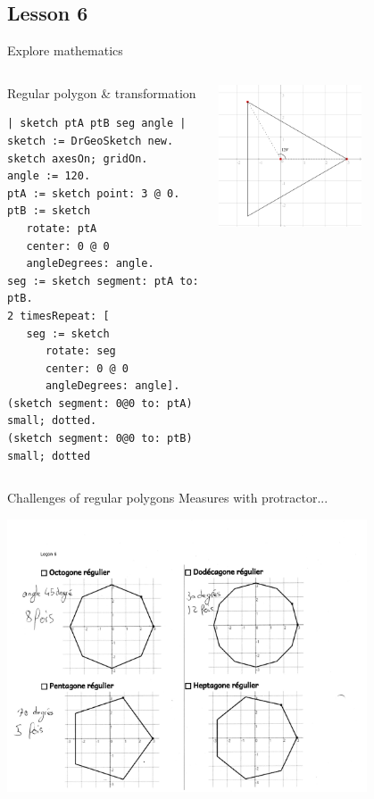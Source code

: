 \documentclass{beamer}
\begin{document}
\subsection{Lesson 6}
\begin{frame}[fragile]{Explore mathematics}
  \begin{columns}[c]
    \begin{column}{0.5\textwidth}
      Regular polygon \& transformation
      \vspace*{10pt}
      \fontsize{9pt}{0pt}\selectfont
      \begin{lstlisting}[language=Smalltalk]
| sketch ptA ptB seg angle |
sketch := DrGeoSketch new.
sketch axesOn; gridOn.
angle := 120.
ptA := sketch point: 3 @ 0.
ptB := sketch
   rotate: ptA
   center: 0 @ 0
   angleDegrees: angle.
seg := sketch segment: ptA to: ptB.
2 timesRepeat: [
   seg := sketch
      rotate: seg
      center: 0 @ 0
      angleDegrees: angle].
(sketch segment: 0@0 to: ptA) small; dotted.
(sketch segment: 0@0 to: ptB) small; dotted        
      \end{lstlisting}
    \end{column}
    \begin{column}{0.5\textwidth}
      \includegraphics[width=0.6\textwidth]{lesson6.png}
    \end{column}
  \end{columns} 
\end{frame}
%
\begin{frame}{Challenges of regular polygons}
  Measures with protractor...
  \begin{center}
      \includegraphics[width=0.8\textwidth]{lesson6-2.png}
  \end{center}
\end{frame}
\end{document}
